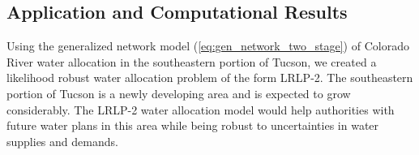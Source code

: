 \documentclass[12pt]{amsart}
\begin{document}
% 
% 

\subsection{Application and Computational Results} \label{sec:comp_results}

Using the generalized network model (\ref{eq:gen_network_two_stage}) of Colorado River water allocation in the southeastern portion of Tucson, we created a likelihood robust water allocation problem of the form LRLP-2.
The southeastern portion of Tucson is a newly developing area and is expected to grow considerably. 
The LRLP-2 water allocation model would help authorities with future water plans in this area while being robust to uncertainties in water supplies and demands.
\end{document}
